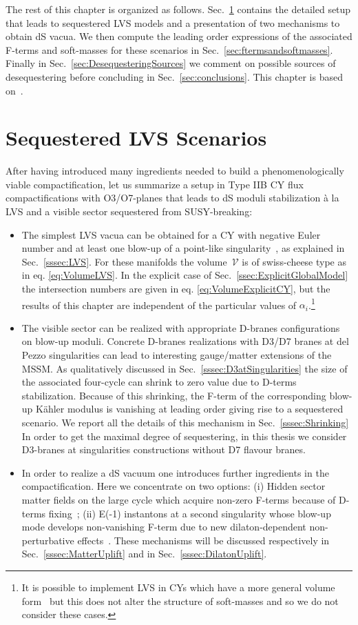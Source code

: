 \documentclass[12pt,a4paper]{book}
\begin{document}
The rest of this chapter is organized as follows. Sec.~\ref{sec:SeqLVS} contains the detailed setup that leads to sequestered LVS models and a presentation of two mechanisms to obtain dS vacua. We then compute the leading order expressions of the associated F-terms and soft-masses for these scenarios in Sec.~\ref{sec:ftermsandsoftmasses}. Finally in Sec.~\ref{sec:DesequesteringSources} we comment on possible sources of desequestering before concluding in Sec.~\ref{sec:conclusions}. This chapter is based on~\cite{Aparicio:2014wxa}.

\section{Sequestered LVS Scenarios}
\label{sec:SeqLVS}

After having introduced many ingredients needed to build a phenomenologically viable compactification, let us summarize a setup in Type IIB CY flux compactifications with O3/O7-planes that leads to dS moduli stabilization
\`a la LVS and a visible sector sequestered from SUSY-breaking:
\begin{itemize}
\item The simplest LVS vacua can be obtained for a CY with negative Euler number and at least one blow-up
of a point-like singularity~\cite{Cicoli:2008va}, as explained in Sec.~\ref{sssec:LVS}. For these manifolds the volume~$\mathcal{V}$ is of swiss-cheese type as in eq. \eqref{eq:VolumeLVS}. In the explicit case of Sec.~\ref{ssec:ExplicitGlobalModel} the intersection numbers are given in eq. \eqref{eq:VolumeExplicitCY}, but the results of this chapter are independent of the particular values of $\alpha_i$.\footnote{It is possible to implement LVS in CYs which have a more general volume form~\cite{Cicoli:2008va} but this does not alter the structure of soft-masses and so we do not consider these cases.}
\item The visible sector can be realized with appropriate D-branes configurations on blow-up moduli. Concrete D-branes realizations with D3/D7 branes at del Pezzo singularities can lead to interesting gauge/matter extensions of the MSSM. As qualitatively discussed in Sec.~\ref{sssec:D3atSingularities} the size of the associated four-cycle can shrink to zero value due to D-terms stabilization. Because of this shrinking, the F-term of the corresponding blow-up K\"ahler modulus is vanishing at leading order giving rise to a sequestered scenario. We report all the details of this mechanism in Sec.~\ref{sssec:Shrinking}  In order to get the maximal degree of sequestering, in this thesis we consider D3-branes at singularities constructions without D7 flavour branes.
\item In order to realize a dS vacuum one introduces further ingredients in the compactification. Here we concentrate on two options:
(i) Hidden sector matter fields on the large cycle which acquire non-zero F-terms because of D-terms fixing~\cite{Cicoli:2012vw}; (ii) E(-1) instantons at a second singularity whose blow-up mode develops non-vanishing F-term due to new dilaton-dependent non-perturbative effects~\cite{Cicoli:2012fh}. These mechanisms will be discussed respectively in Sec.~\ref{sssec:MatterUplift} and in Sec.~\ref{sssec:DilatonUplift}.
\end{itemize}
\end{document}
